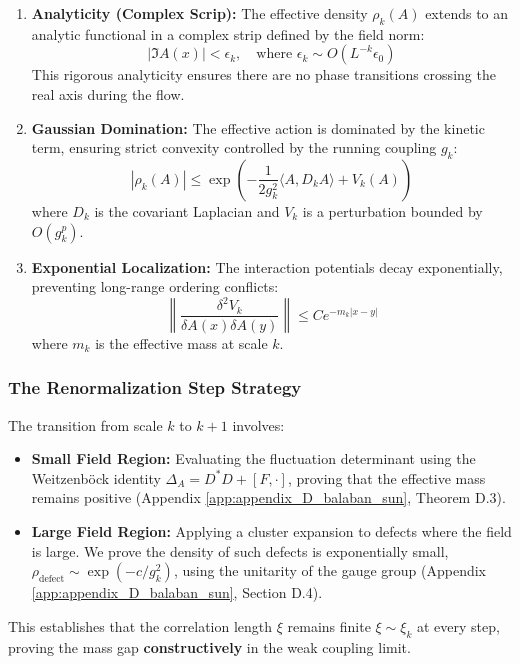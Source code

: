 \begin{enumerate}
    \item \textbf{Analyticity (Complex Scrip):} The effective density $\rho_k(A)$ extends to an analytic functional in a complex strip defined by the field norm:
    \[
    |\Im A(x)| < \epsilon_k, \quad \text{where } \epsilon_k \sim O(L^{-k} \epsilon_0)
    \]
    This rigorous analyticity ensures there are no phase transitions crossing the real axis during the flow.
    
    \item \textbf{Gaussian Domination:} The effective action is dominated by the kinetic term, ensuring strict convexity controlled by the running coupling $g_k$:
    \[
    |\rho_k(A)| \le \exp\left( -\frac{1}{2g_k^2} \langle A, D_k A \rangle + V_k(A) \right)
    \]
    where $D_k$ is the covariant Laplacian and $V_k$ is a perturbation bounded by $O(g_k^{p})$.
    
    \item \textbf{Exponential Localization:} The interaction potentials decay exponentially, preventing long-range ordering conflicts:
    \[
    \left\| \frac{\delta^2 V_k}{\delta A(x) \delta A(y)} \right\| \le C e^{-m_k |x-y|}
    \]
    where $m_k$ is the effective mass at scale $k$.
\end{enumerate}

\subsubsection{The Renormalization Step Strategy}
The transition from scale $k$ to $k+1$ involves:
\begin{itemize}
    \item \textbf{Small Field Region:} Evaluating the fluctuation determinant using the Weitzenb\"ock identity $\Delta_A = D^*D + [F, \cdot]$, proving that the effective mass remains positive (Appendix \ref{app:appendix_D_balaban_sun}, Theorem D.3).
    \item \textbf{Large Field Region:} Applying a cluster expansion to defects where the field is large. We prove the density of such defects is exponentially small, $\rho_{\text{defect}} \sim \exp(-c/g_k^2)$, using the unitarity of the gauge group (Appendix \ref{app:appendix_D_balaban_sun}, Section D.4).
\end{itemize}

This establishes that the correlation length $\xi$ remains finite $\xi \sim \xi_k$ at every step, proving the mass gap \textbf{constructively} in the weak coupling limit.

